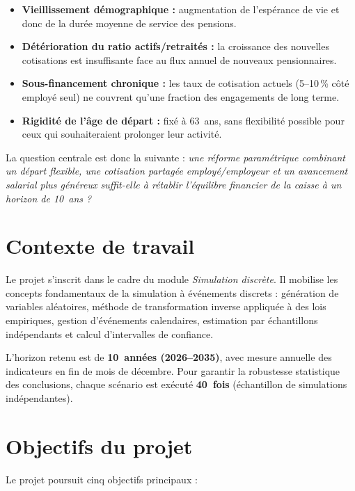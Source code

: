 \documentclass[12pt,a4paper,oneside]{report}
\begin{document}
\begin{itemize}
  \item \textbf{Vieillissement démographique :} augmentation de l'espérance
        de vie et donc de la durée moyenne de service des pensions.
  \item \textbf{Détérioration du ratio actifs/retraités :} la croissance
        des nouvelles cotisations est insuffisante face au flux annuel
        de nouveaux pensionnaires.
  \item \textbf{Sous-financement chronique :} les taux de cotisation
        actuels (5--10\,\% côté employé seul) ne couvrent qu'une fraction
        des engagements de long terme.
  \item \textbf{Rigidité de l'âge de départ :} fixé à 63~ans, sans
        flexibilité possible pour ceux qui souhaiteraient prolonger leur
        activité.
\end{itemize}

La question centrale est donc la suivante : \textit{une réforme
paramétrique combinant un départ flexible, une cotisation partagée
employé/employeur et un avancement salarial plus généreux suffit-elle à
rétablir l'équilibre financier de la caisse à un horizon de 10~ans ?}

\section{Contexte de travail}

Le projet s'inscrit dans le cadre du module \emph{Simulation discrète}.
Il mobilise les concepts fondamentaux de la simulation à événements
discrets : génération de variables aléatoires, méthode de transformation
inverse appliquée à des lois empiriques, gestion d'événements
calendaires, estimation par échantillons indépendants et calcul
d'intervalles de confiance.

L'horizon retenu est de \textbf{10~années (2026--2035)}, avec mesure
annuelle des indicateurs en fin de mois de décembre. Pour garantir la
robustesse statistique des conclusions, chaque scénario est exécuté
\textbf{40~fois} (échantillon de simulations indépendantes).

\section{Objectifs du projet}

Le projet poursuit cinq objectifs principaux :
\end{document}
